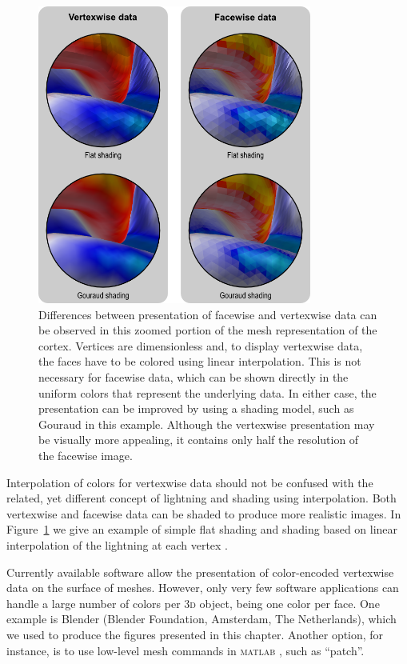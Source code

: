 \begin{figure}[!tp]  %
\centering
\includegraphics[width=9cm]{images/display.png}
\caption[Differences between presentation of facewise and vertexwise area.]{Differences between presentation of facewise and vertexwise data can be observed in this zoomed portion of the mesh representation of the cortex. Vertices are dimensionless and, to display vertexwise data, the faces have to be colored using linear interpolation. This is not necessary for facewise data, which can be shown directly in the uniform colors that represent the underlying data. In either case, the presentation can be improved by using a shading model, such as Gouraud in this example. Although the vertexwise presentation may be visually more appealing, it contains only half the resolution of the facewise image.}
\label{fig:areal:display}
\end{figure}

Interpolation of colors for vertexwise data should not be confused with the related, yet different concept of lightning and shading using interpolation. Both vertexwise and facewise data can be shaded to produce more realistic images. In Figure~\ref{fig:areal:display} we give an example of simple flat shading and shading based on linear interpolation of the lightning at each vertex \citep{Gouraud1971}.

Currently available software allow the presentation of color-encoded vertexwise data on the surface of meshes. However, only very few software applications can handle a large number of colors per \textsc{3d} object, being one color per face. One example is Blender (Blender Foundation, Amsterdam, The Netherlands), which we used to produce the figures presented in this chapter. Another option, for instance, is to use low-level mesh commands in \textsc{matlab} \citep{MATLAB2015}, such as ``patch''.

